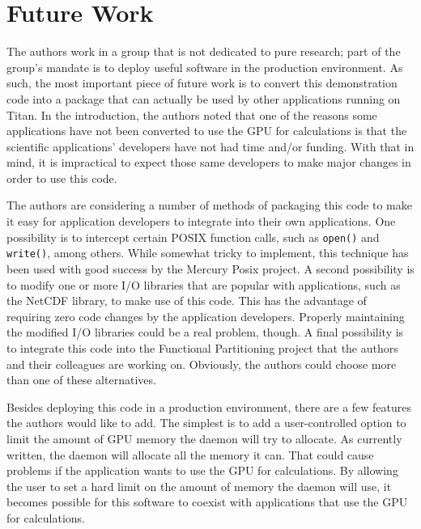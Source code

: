 \section{Future Work}
\label{sec:future}

The authors work in a group that is not dedicated to pure research; part of the group's mandate is to deploy useful software in the production environment.  As such, the most important piece of future work is to convert this demonstration code into a package that can actually be used by other applications running on Titan.  In the introduction, the authors noted that one of the reasons some applications have not been converted to use the GPU for calculations is that the scientific applications' developers have not had time and/or funding.  With that in mind, it is impractical to expect those same developers to make major changes in order to use this code.  

The authors are considering a number of methods of packaging this code to make it easy for application developers to integrate into their own applications.  One possibility is to intercept certain POSIX function calls, such as \texttt{open()} and \texttt{write()}, among others.  While somewhat tricky to implement, this technique has been used with good success by the Mercury Posix project.\cite{mercury_posix_demo}  A second possibility is to modify one or more I/O libraries that are popular with applications, such as the NetCDF library, to make use of this code.  This has the advantage of requiring zero code changes by the application developers.  Properly maintaining the modified I/O libraries could be a real problem, though. A final possibility is to integrate this code into the Functional Partitioning project that the authors and their colleagues are working on.\cite{Li:2010:FPO:1884643.1884686}  Obviously, the authors could choose more than one of these alternatives.


Besides deploying this code in a production environment, there are a few features the authors would like to add.  The simplest is to add a user-controlled option to limit the amount of GPU memory the daemon will try to allocate.  As currently written, the daemon will allocate all the memory it can.  That could cause problems if the application wants to use the GPU for calculations.  By allowing the user to set a hard limit on the amount of memory the daemon will use, it becomes possible for this software to coexist with applications that use the GPU for calculations.

